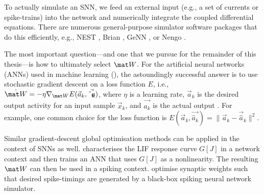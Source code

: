 To actually simulate an SNN, we feed an external input (e.g., a set of currents or spike-trains) into the network and numerically integrate the coupled differential equations.
There are numerous general-purpose simulator software packages that do this efficiently, e.g., NEST \citep{gewaltig2007nest}, Brian \citep{stimberg2019brian}, GeNN \citep{yavuz2016genn}, or Nengo \citep{bekolay2014nengo}.

The most important question---and one that we pursue for the remainder of this thesis---is how to ultimately select $\mat W$.
For the artificial neural networks (ANNs) used in machine learning (), the astoundingly successful answer is to use stochastic gradient descent on a loss function $E$, i.e., $\dot{\mat W} = -\eta \nabla_{\mat W} E(\vec a_k, \vec {\hat a_k})$, where $\eta$ is a learning rate, $\vec a_k$ is the desired output activity for an input sample $\vec x_k$, and $\vec{\hat a_k}$ is the actual output \citep{lecun2015deep}.
For example, one common choice for the loss function is $E(\vec a_k, \vec {\hat a_k}) = \|\vec a_k - \vec{\hat a}_k\|^2$.

Similar gradient-descent global optimisation methods can be applied in the context of SNNs as well.
 characterises the LIF response curve $G[J]$ in a network context and then trains an ANN that uses $G[J]$ as a nonlinearity.
The resulting $\mat W$ can then be used in a spiking context.
 optimise synaptic weights such that desired spike-timings are generated by a black-box spiking neural network simulator.



